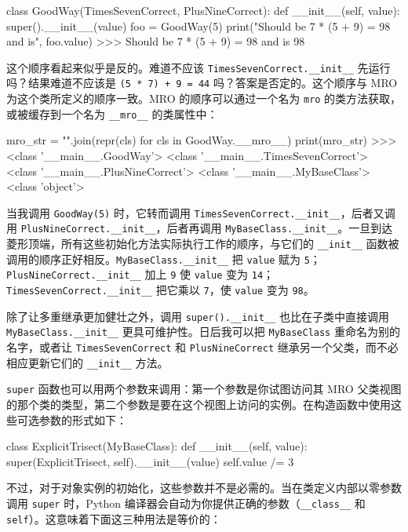\begin{codebox}[python]
class GoodWay(TimesSevenCorrect, PlusNineCorrect):
    def __init__(self, value):
        super().__init__(value)
foo = GoodWay(5)
print("Should be 7 * (5 + 9) = 98 and is", foo.value)
>>>
Should be 7 * (5 + 9) = 98 and is 98
\end{codebox}

这个顺序看起来似乎是反的。难道不应该 \texttt{TimesSevenCorrect.\_\_init\_\_} 先运行吗？结果难道不应该是 \texttt{(5 * 7) + 9 = 44} 吗？答案是否定的。这个顺序与 MRO 为这个类所定义的顺序一致。MRO 的顺序可以通过一个名为 \texttt{mro} 的类方法获取，或被缓存到一个名为 \texttt{\_\_mro\_\_} 的类属性中：

\begin{codebox}[python]
mro_str = "\n".join(repr(cls) for cls in GoodWay.__mro__)
print(mro_str)
>>>
<class '__main__.GoodWay'>
<class '__main__.TimesSevenCorrect'>
<class '__main__.PlusNineCorrect'>
<class '__main__.MyBaseClass'>
<class 'object'>
\end{codebox}

当我调用 \texttt{GoodWay(5)} 时，它转而调用 \texttt{TimesSevenCorrect.\_\_init\_\_}，后者又调用 \texttt{PlusNineCorrect.\_\_init\_\_}，后者再调用 \texttt{MyBaseClass.\_\_init\_\_}。一旦到达菱形顶端，所有这些初始化方法实际执行工作的顺序，与它们的 \texttt{\_\_init\_\_} 函数被调用的顺序正好相反。\texttt{MyBaseClass.\_\_init\_\_} 把 \texttt{value} 赋为 \texttt{5}；\texttt{PlusNineCorrect.\_\_init\_\_} 加上 \texttt{9} 使 \texttt{value} 变为 \texttt{14}；\texttt{TimesSevenCorrect.\_\_init\_\_} 把它乘以 \texttt{7}，使 \texttt{value} 变为 \texttt{98}。

除了让多重继承更加健壮之外，调用 \texttt{super().\_\_init\_\_} 也比在子类中直接调用 \texttt{MyBaseClass.\_\_init\_\_} 更具可维护性。日后我可以把 \texttt{MyBaseClass} 重命名为别的名字，或者让 \texttt{TimesSevenCorrect} 和 \texttt{PlusNineCorrect} 继承另一个父类，而不必相应更新它们的 \texttt{\_\_init\_\_} 方法。

\texttt{super} 函数也可以用两个参数来调用：第一个参数是你试图访问其 MRO 父类视图的那个类的类型，第二个参数是要在这个视图上访问的实例。在构造函数中使用这些可选参数的形式如下：

\begin{codebox}[python]
class ExplicitTrisect(MyBaseClass):
    def __init__(self, value):
        super(ExplicitTrisect, self).__init__(value)
        self.value /= 3
\end{codebox}

不过，对于对象实例的初始化，这些参数并不是必需的。当在类定义内部以零参数调用 \texttt{super} 时，Python 编译器会自动为你提供正确的参数（\texttt{\_\_class\_\_} 和 \texttt{self}）。这意味着下面这三种用法是等价的：

